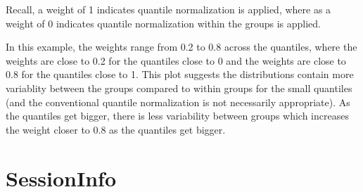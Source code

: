\documentclass{article}
\begin{document}
Recall, a weight of 1 indicates quantile normalization is applied,
where as a weight of 0 indicates quantile normalization
within the groups is applied.

In this example, the weights range from 0.2 to 0.8 across the quantiles,
where the weights are close to 0.2 for the quantiles close to 0 and the
weights are close to 0.8 for the quantiles close to 1.
This plot suggests the distributions contain more variablity between
the groups compared to within groups for the small quantiles (and
the conventional quantile normalization is not necessarily appropriate).
As the quantiles get bigger, there is less variability between groups which
increases the weight closer to 0.8 as the quantiles get bigger.


\section{SessionInfo}
\end{document}
